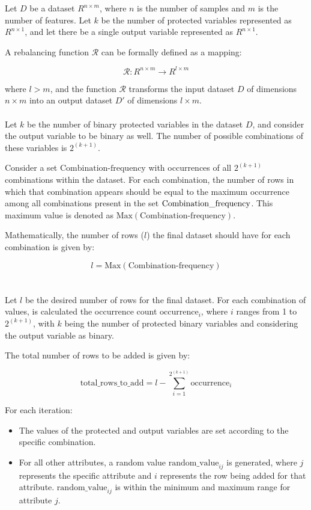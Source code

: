 \documentclass[12pt,a4paper,openright,twoside]{book}
\begin{document}
Let \( D \) be a dataset \( R^{n \times m} \), where \( n \) is the number of samples and \( m \) is the number of features. Let \( k \) be the number of protected variables represented as \( R^{n \times 1} \), and let there be a single output variable represented as \( R^{n \times 1} \).

A rebalancing function \( \mathcal{R} \) can be formally defined as a mapping:

\[
\mathcal{R}: R^{n \times m} \rightarrow R^{l \times m}
\]

where \( l > m \), and the function \( \mathcal{R} \) transforms the input dataset \( D \) of dimensions \( n \times m \) into an output dataset \( D' \) of dimensions \( l \times m \).\\
\\
Let \( k \) be the number of binary protected variables in the dataset \( D \), and consider the output variable to be binary as well. The number of possible combinations of these variables is \( 2^{(k+1)} \).

Consider a set \( \text{Combination-frequency} \) with occurrences of all \( 2^{(k+1)} \) combinations within the dataset. For each combination, the number of rows in which that combination appears should be equal to the maximum occurrence among all combinations present in the set \( \text{Combination\textunderscore frequency} \). This maximum value is denoted as \( \text{Max}(\text{Combination-frequency}) \).

Mathematically, the number of rows (\( l \)) the final dataset should have for each combination is given by:

\[
l = \text{Max}(\text{Combination-frequency})
\]\\
\\
Let \( l \) be the desired number of rows for the final dataset. For each combination of values, is calculated the occurrence count \( \text{occurrence}_i \), where \( i \) ranges from 1 to \( 2^{(k+1)} \), with \( k \) being the number of protected binary variables and considering the output variable as binary.

The total number of rows to be added is given by:

\[
\text{total\_rows\_to\_add} = l - \sum_{i=1}^{2^{(k+1)}} \text{occurrence}_i
\]

For each iteration:
\begin{itemize}
    \item The values of the protected and output variables are set according to the specific combination.
    \item For all other attributes, a random value \( \text{random\_value}_{ij} \) is generated, where \( j \) represents the specific attribute and \( i \) represents the row being added for that attribute. \( \text{random\_value}_{ij} \) is within the minimum and maximum range for attribute \( j \).
\end{itemize}
\end{document}
